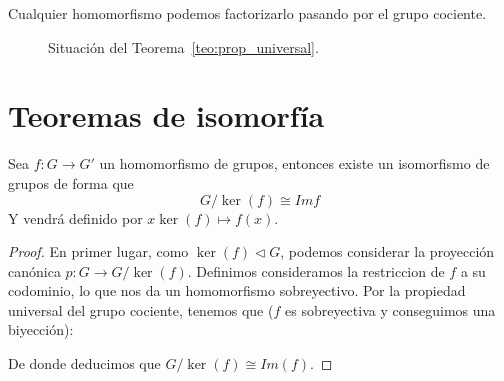 Cualquier homomorfismo podemos factorizarlo pasando por el grupo cociente.

\begin{figure}[H]
    \centering
    \caption{Situación del Teorema~\ref{teo:prop_universal}.}
    \label{fig:teo_propiedad_universal}
\end{figure}

\section{Teoremas de isomorfía}
\begin{teo}
    Sea $f:G\to G'$ un homomorfismo de grupos, entonces existe un isomorfismo de grupos de forma que
    \begin{equation*}
        G/\ker(f) \cong Imf
    \end{equation*}
    Y vendrá definido por $x\ker(f) \mapsto f(x)$.
    \begin{proof}
        En primer lugar, como $\ker(f) \lhd G$, podemos considerar la proyección canónica $p:G\to G/\ker(f)$. Definimos consideramos la restriccion de $f$ a su codominio, lo que nos da un homomorfismo sobreyectivo. Por la propiedad universal del grupo cociente, tenemos que ($f$ es sobreyectiva y conseguimos una biyección):
    \begin{figure}[H]
        \centering
    \end{figure}
    De donde deducimos que $G/\ker(f) \cong Im(f)$.
    \end{proof}
\end{teo}

